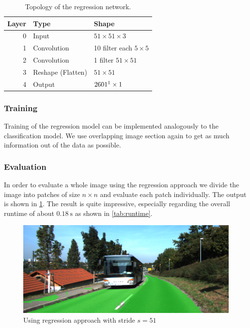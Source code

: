 \begin{table}[H]
    \normalsize
    \centering
    \begin{tabular}{r l l}
        \toprule
        \textbf{Layer} & \textbf{Type}  & \textbf{Shape}  \\
        \midrule
        0     & Input &  $51 \times 51 \times 3$ \\
        1     & Convolution & 10 filter  each $5 \times 5$ \\
        2     & Convolution & 1 filter $51 \times 51$  \\
        3     & Reshape (Flatten) & $51 \times 51$ \\
        4     & Output     & $2601\footnotemark \times 1$\\
        \bottomrule
    \end{tabular}
    \caption{Topology of the regression network.}%
\label{tab:topo2}
\end{table}


\subsubsection{Training}
Training of the regression model can be implemented analogously to the
classification model. We use overlapping image section again to get as much
information out of the data as possible.

\subsubsection{Evaluation}
In order to evaluate a whole image using the regression approach we divide the
image into patches of size $n \times n$ and evaluate each patch individually.
The output is shown in \cref{fig:reg_stride2}. The result is quite impressive,
especially regarding the overall runtime of about $\SI{0.18}{\second}$ as shown
in \cref{tab:runtime}.

\begin{figure}[tbp]
    \centering
    \includegraphics[width=\columnwidth]{figures/models/testing2-um_32_conv_stride51.png}
    \caption{Using regression approach with stride $s=51$}%
\label{fig:reg_stride2}
\end{figure}


